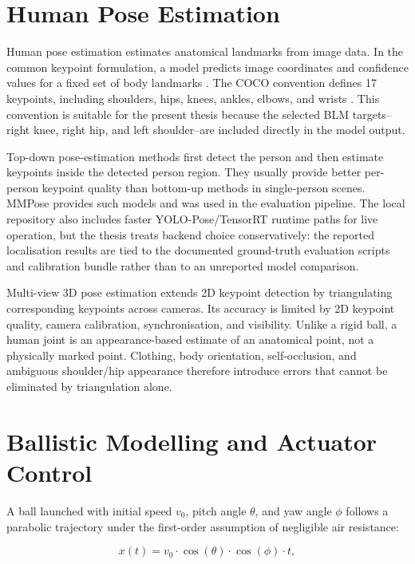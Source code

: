 \section{Human Pose Estimation}

Human pose estimation estimates anatomical landmarks from image data. In the common keypoint formulation, a model predicts image coordinates and confidence values for a fixed set of body landmarks \cite{ref15}. The COCO convention defines 17 keypoints, including shoulders, hips, knees, ankles, elbows, and wrists \cite{ref16}. This convention is suitable for the present thesis because the selected BLM targets--right knee, right hip, and left shoulder--are included directly in the model output.

Top-down pose-estimation methods first detect the person and then estimate keypoints inside the detected person region. They usually provide better per-person keypoint quality than bottom-up methods in single-person scenes. MMPose \cite{ref17} provides such models and was used in the evaluation pipeline. The local repository also includes faster YOLO-Pose/TensorRT runtime paths for live operation, but the thesis treats backend choice conservatively: the reported localisation results are tied to the documented ground-truth evaluation scripts and calibration bundle rather than to an unreported model comparison.

Multi-view 3D pose estimation extends 2D keypoint detection by triangulating corresponding keypoints across cameras. Its accuracy is limited by 2D keypoint quality, camera calibration, synchronisation, and visibility. Unlike a rigid ball, a human joint is an appearance-based estimate of an anatomical point, not a physically marked point. Clothing, body orientation, self-occlusion, and ambiguous shoulder/hip appearance therefore introduce errors that cannot be eliminated by triangulation alone.

\section{Ballistic Modelling and Actuator Control}

A ball launched with initial speed $v_0$, pitch angle $\theta$, and yaw angle $\phi$ follows a parabolic trajectory under the first-order assumption of negligible air resistance:

\begin{equation}
x(t) = v_0 \cdot \cos(\theta) \cdot \cos(\phi) \cdot t ,
\label{eq:2_2}
\end{equation}

